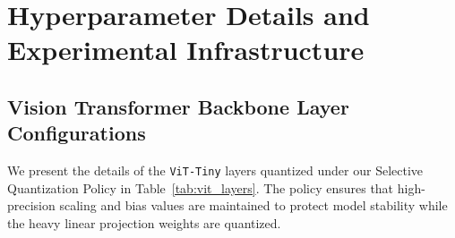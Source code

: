 \documentclass{article}
\theoremstyle{plain}
\theoremstyle{definition}
\theoremstyle{remark}
\begin{document}

\printAffiliationsAndNotice{}  %











\newpage
\appendix
\onecolumn
\section{Hyperparameter Details and Experimental Infrastructure}
\label{appendix:details}

\subsection{Vision Transformer Backbone Layer Configurations}
We present the details of the \texttt{ViT-Tiny} layers quantized under our Selective Quantization Policy in Table~\ref{tab:vit_layers}. The policy ensures that high-precision scaling and bias values are maintained to protect model stability while the heavy linear projection weights are quantized.
\end{document}
